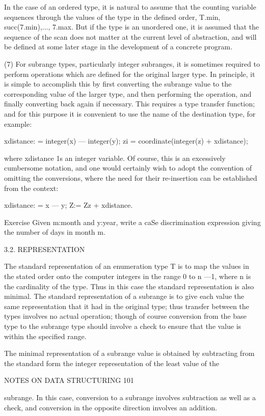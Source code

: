 In the case of an ordered type, it is natural to assume that the counting variable sequences through the values of the type in the defined order, T.min, succ(7.min),..., 7.max. But if the type is an unordered one, it is assumed that the sequence of the scan does not matter at the current level of abstraction, and will be defined at some later stage in the development of a concrete program.

(7) For subrange types, particularly integer subranges, it is sometimes required to perform operations which are defined for the original larger type. In principle, it is simple to accomplish this by first converting the subrange value to the corresponding value of the larger type, and then performing the operation, and finally converting back again if necessary. This requires a type transfer function; and for this purpose it is convenient to use the name of the destination type, for example:

xdistance: = integer(x) — integer(y); zi = coordinate(integer(z) + xdistance);

where xdistance 1s an integer variable. Of course, this is an excessively cumbersome notation, and one would certainly wish to adopt the convention of omitting the conversions, where the need for their re-insertion can be established from the context:

xdistance: = x — y; Z:= Zz + xdistance.

Exercise Given m:month and y:year, write a caSe discrimination expression giving the number of days in month m.

3.2. REPRESENTATION

The standard representation of an enumeration type T is to map the values in the stated order onto the computer integers in the range 0 to n —1, where n is the cardinality of the type. Thus in this case the standard representation is also minimal. The standard representation of a subrange is to give each value the same representation that it had in the original type; thus transfer between the types involves no actual operation; though of course conversion from the base type to the subrange type should involve a check to ensure that the value is within the specified range.

The minimal representation of a subrange value is obtained by subtracting from the standard form the integer representation of the least value of the

NOTES ON DATA STRUCTURING 101

subrange. In this case, conversion to a subrange involves subtraction as well as a check, and conversion in the opposite direction involves an addition.

